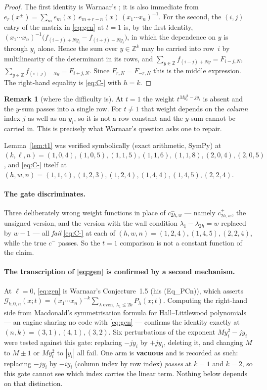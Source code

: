 \documentclass[11pt]{article}
\theoremstyle{definition}
\newtheorem{remark}[theorem]{Remark}
\newcommand{\la}{\lambda}
\newcommand{\Z}{\mathbb{Z}}
\begin{document}
\begin{proof}
The first identity is Warnaar's \cite[proof of Lem.~5.2]{W}; it is also
immediate from $e_r(x^{\pm})=\sum_{m}e_m(x)\,e_{m+r-n}(x)\,(x_1\cdots x_n)^{-1}$.
For the second, the $(i,j)$ entry of the matrix in \eqref{eq:gen} at $t=1$ is,
by the first identity,
$(x_1\cdots x_n)^{-1}\bigl(f_{(i-j)+Ny_i}-f_{(i+j)-Ny_i}\bigr)$, in which the
dependence on $y$ is through $y_i$ alone. Hence the sum over $y\in\Z^{k}$ may be
carried into row~$i$ by multilinearity of the determinant in its rows, and
$\sum_{y\in\Z}f_{(i-j)+Ny}=F_{i-j,N}$,
$\sum_{y\in\Z}f_{(i+j)-Ny}=F_{i+j,N}$. Since $F_{r,N}=F_{-r,N}$ this is the
middle expression. The right-hand equality is \eqref{eq:C-} with $h=k$.
\end{proof}

\begin{remark}[where the difficulty is]
At $t=1$ the weight $t^{My_i^2-jy_i}$ is absent and the $y$-sum passes into a
single row. For $t\ne1$ that weight depends on the \emph{column} index $j$ as
well as on $y_i$, so it is not a row constant and the $y$-sum cannot be carried
in. This is precisely what Warnaar's question asks one to repair.
\end{remark}

Lemma~\ref{lem:t1} was verified symbolically (exact arithmetic, SymPy) at
$(k,\ell,n)=(1,0,4),(1,0,5),(1,1,5),(1,1,6),(1,1,8),(2,0,4),(2,0,5)$, and
\eqref{eq:C-} itself at $(h,w,n)=(1,1,4),(1,2,3),(1,2,4),(1,4,4),(1,4,5),(2,2,4)$.

\paragraph{The gate discriminates.} Three deliberately wrong weight functions
in place of $c^{-}_{2h,w}$ --- namely $c^{+}_{2h,w}$, the unsigned version, and
the version with the wall condition $\la_1-\la_{2h}=w$ replaced by $w-1$ ---
all \emph{fail} \eqref{eq:C-} at each of $(h,w,n)=(1,2,4),(1,4,5),(2,2,4)$,
while the true $c^{-}$ passes. So the $t=1$ comparison is not a constant
function of the claim.

\paragraph{The transcription of \eqref{eq:gen} is confirmed by a second
mechanism.} At $\ell=0$, \eqref{eq:gen} is Warnaar's Conjecture~1.5
(his (Eq\_PCn)), which asserts
$\mathcal G_{k,0,n}(x;t)=(x_1\cdots x_n)^{-k}\sum_{\la\text{ even},\ \la_1\le2k}P_\la(x;t)$.
Computing the right-hand side from Macdonald's symmetrisation formula for
Hall--Littlewood polynomials --- an engine sharing no code with
\eqref{eq:gen} --- confirms the identity exactly at $(n,k)=(3,1),(4,1),(3,2)$.
Six perturbations of the exponent $My_i^2-jy_i$ were tested against this gate:
replacing $-jy_i$ by $+jy_i$, deleting it, and changing $M$ to $M\pm1$ or
$My_i^2$ to $|y_i|$ all fail. One arm is \textbf{vacuous} and is recorded as
such: replacing $-jy_i$ by $-iy_i$ (column index by row index) \emph{passes} at
$k=1$ and $k=2$, so this gate cannot see which index carries the linear term.
Nothing below depends on that distinction.
\end{document}
